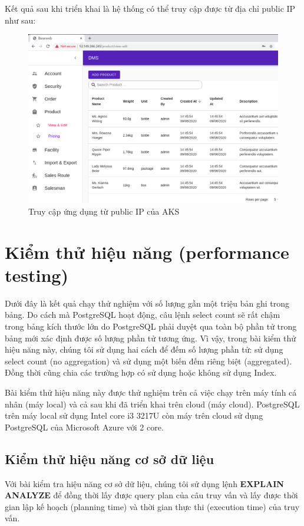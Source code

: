 Kết quả sau khi triển khai là hệ thống có thể truy cập được
từ địa chỉ public IP như sau:
\begin{figure}[H]
\centering
\includegraphics[width=\textwidth]{images/deployed-website.png}
\caption{Truy cập ứng dụng từ public IP của AKS}
\end{figure}

\section{Kiểm thử hiệu năng (performance testing)}
Dưới đây là kết quả chạy thử nghiệm với số
lượng gần một triệu bản ghi trong bảng. Do cách mà PostgreSQL
hoạt động, câu lệnh select count sẽ rất chậm trong bảng kích thước lớn
do PostgreSQL phải duyệt qua toàn bộ phần tử trong bảng mới
xác định được số lượng phần tử tương ứng. Vì vậy, trong bài kiểm
thử hiệu năng này, chúng tôi sử dụng hai cách để đếm 
số lượng phần tử: sử dụng select count (no aggregation) và 
sử dụng một biến đếm riêng biệt (aggregated). Đồng thời cũng chia
các trường hợp có sử dụng hoặc không sử dụng Index.

Bài kiểm thử hiệu năng này được thử nghiệm trên cả việc chạy trên máy tính
cá nhân (máy local) và cả sau khi đã triển khai trên cloud (máy cloud).
PostgreSQL trên máy local sử dụng Intel core i3 3217U còn máy trên
cloud sử dụng PostgreSQL của Microsoft Azure với 2 core.

\subsection{Kiểm thử hiệu năng cơ sở dữ liệu}
Với bài kiểm tra hiệu năng cơ sở dữ liệu, chúng tôi sử dụng
lệnh \textbf{EXPLAIN ANALYZE} để đồng thời lấy được query plan
của câu truy vấn và lấy được thời gian lập kế hoạch (planning time)
và thời gian thực thi (execution time) của truy vấn.
